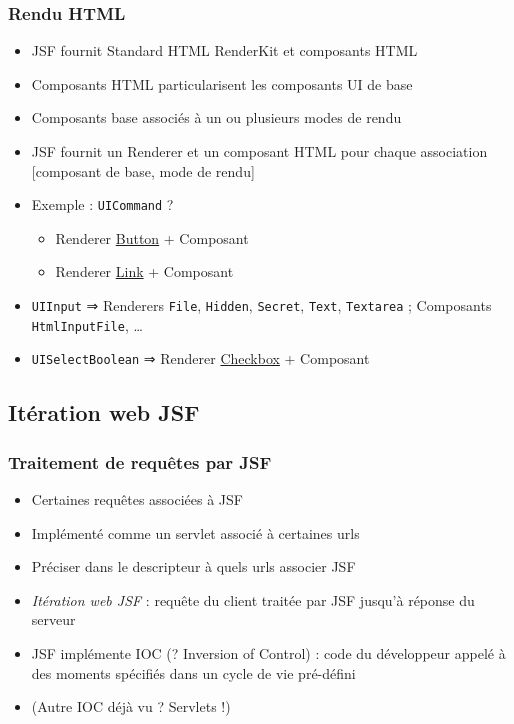 \documentclass[english, french]{beamer}
\begin{document}
\begin{frame}
	\frametitle{Rendu HTML}
	\begin{itemize}
		\item JSF fournit Standard HTML RenderKit et composants HTML
		\item Composants HTML particularisent les composants UI de base
		\item Composants base associés à un ou plusieurs modes de rendu
		\item JSF fournit un Renderer et un composant HTML pour chaque association [composant de base, mode de rendu]
		\item Exemple : \texttt{UICommand} ? \pause
		\begin{itemize}
			\item Renderer \href{https://docs.oracle.com/javaee/7/javaserver-faces-2-2/renderkitdocs/HTML_BASIC/javax.faces.Commandjavax.faces.Button.html}{Button} + Composant 
			\item Renderer \href{https://docs.oracle.com/javaee/7/javaserver-faces-2-2/renderkitdocs/HTML_BASIC/javax.faces.Commandjavax.faces.Link.html}{Link} + Composant 
		\end{itemize}
		\pause
		\item \texttt{UIInput} ⇒ Renderers \texttt{File}, \texttt{Hidden}, \texttt{Secret}, \texttt{Text}, \texttt{Textarea} ; Composants \texttt{HtmlInputFile}, …
		\item \texttt{UISelectBoolean} ⇒ Renderer \href{https://docs.oracle.com/javaee/7/javaserver-faces-2-2/renderkitdocs/HTML_BASIC/javax.faces.SelectBooleanjavax.faces.Checkbox.html}{Checkbox} + Composant 
	\end{itemize}
\end{frame}

\subsection[Itération web]{Itération web JSF}
\begin{frame}
	\frametitle{Traitement de requêtes par JSF}
	\begin{itemize}
		\item Certaines requêtes associées à JSF
		\item Implémenté comme un servlet associé à certaines urls
		\item Préciser dans le descripteur à quels urls associer JSF
		\item \emph{Itération web JSF} : requête du client {\tiny traitée par JSF} jusqu’à réponse du serveur
		\item JSF implémente IOC (? \pause Inversion of Control) \pause : code du développeur appelé à des moments spécifiés dans un cycle de vie pré-défini
		\item (Autre IOC déjà vu ? \pause Servlets !)
	\end{itemize}
\end{frame}
\end{document}
